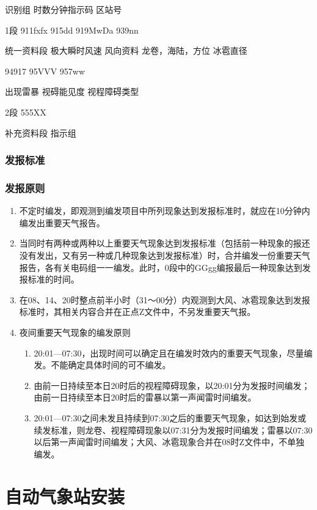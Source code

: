 ﻿\documentclass[UTF8,11pt]{ctexbook}%
\begin{document}
识别组	 	时数分钟指示码		区站号

1段			911fxfx		915dd		919MwDa		939nn

统一资料段	极大瞬时风速	风向资料		龙卷，海陆，方位	冰雹直径	

			94917		95VVV		957ww

     出现雷暴		视碍能见度	视程障碍类型

2段			555XX		

补充资料段	指示组		

\subsection{发报标准}

\subsection{发报原则}
\begin{enumerate}
	\item 不定时编发，即观测到编发项目中所列现象达到发报标准时，就应在10分钟内编发出重要天气报告。
	\item 当同时有两种或两种以上重要天气现象达到发报标准（包括前一种现象的报还没有发出，又有另一种或几种现象达到发报标准）时，合并编发一份重要天气报告，各有关电码组一一编发。此时，0段中的GGgg编报最后一种现象达到发报标准的时间。
	\item 在08、14、20时整点前半小时（31～00分）内观测到大风、冰雹现象达到发报标准时，其相关内容合并在正点Z文件中，不另发重要天气报。
	\item 夜间重要天气现象的编发原则
	\begin{enumerate}
		\item 20:01—07:30，出现时间可以确定且在编发时效内的重要天气现象，尽量编发。不能确定具体时间的可不编发。
		\item 由前一日持续至本日20时后的视程障碍现象，以20:01分为发报时间编发；由前一日持续至本日20时后的雷暴以第一声闻雷时间编发。
		\item 20:01—07:30之间未发且持续到07:30之后的重要天气现象，如达到始发或续发标准，则龙卷、视程障碍现象以07:31分为发报时间编发；雷暴以07:30以后第一声闻雷时间编发；大风、冰雹现象合并在08时Z文件中，不单独编发。
	\end{enumerate}
\end{enumerate}

\chapter{自动气象站安装}
\end{document}
